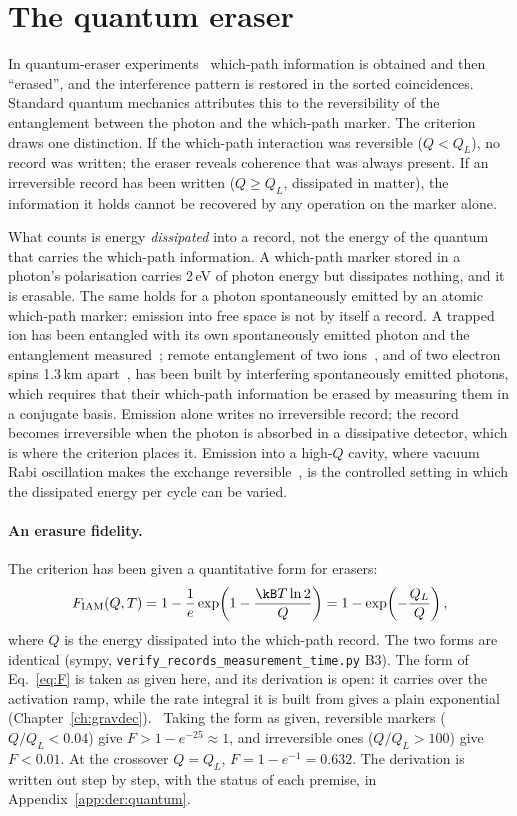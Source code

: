 \section{The quantum eraser}\label{sec:mp_eraser}
In quantum-eraser experiments~\cite{ScullyDruhl1982,Kim2000} which-path information is obtained and then ``erased'', and the interference pattern is
restored in the sorted coincidences. Standard quantum mechanics attributes this to the reversibility of the entanglement between the photon and the
which-path marker. The criterion draws one distinction. If the which-path interaction was reversible ($Q<Q_L$), no record was written; the eraser reveals
coherence that was always present. If an irreversible record has been written ($Q\ge Q_L$, dissipated in matter), the information it holds cannot be
recovered by any operation on the marker alone. \interp

What counts is energy \emph{dissipated} into a record, not the energy of the quantum that carries the which-path information. A which-path marker
stored in a photon's polarisation carries 2\,eV of photon energy but dissipates nothing, and it is erasable. The same holds for a photon spontaneously
emitted by an atomic which-path marker: emission into free space is not by itself a record. A trapped ion has been entangled with its own
spontaneously emitted photon and the entanglement measured~\cite{Blinov2004}; remote entanglement of two ions~\cite{Moehring2007}, and of two electron
spins 1.3\,km apart~\cite{Hensen2015}, has been built by interfering spontaneously emitted photons, which requires that their which-path information be
erased by measuring them in a conjugate basis. \observed{} Emission alone writes no irreversible record; the record becomes irreversible when the photon
is absorbed in a dissipative detector, which is where the criterion places it. Emission into a high-$Q$ cavity, where vacuum Rabi oscillation makes the
exchange reversible~\cite{Haroche2006,Blais2021}, is the controlled setting in which the dissipated energy per cycle can be varied. \interp

\paragraph{An erasure fidelity.} The criterion has been given a quantitative form for erasers:
\begin{equation}
F_{\mathrm{IAM}}(Q,T)=1-\frac{1}{e}\exp\!\left(1-\frac{\kB T\ln2}{Q}\right)=1-\exp\!\left(-\frac{Q_L}{Q}\right),
\label{eq:F}
\end{equation}
where $Q$ is the energy dissipated into the which-path record. The two forms are identical (sympy, \texttt{verify\_records\_measurement\_time.py} B3).
\calc{} The form of Eq.~\eqref{eq:F} is taken as given here, and its derivation is open: it carries over the activation ramp, while the rate integral it is built from gives a plain exponential (Chapter~\ref{ch:gravdec}). \conjecture\ Taking the form as given, reversible markers ($Q/Q_L<0.04$) give $F>1-e^{-25}\approx1$, and
irreversible ones ($Q/Q_L>100$) give $F<0.01$. \calc{} At the crossover $Q=Q_L$, $F=1-e^{-1}=0.632$.
The derivation is written out step by step, with the status of each premise, in Appendix~\ref{app:der:quantum}.

